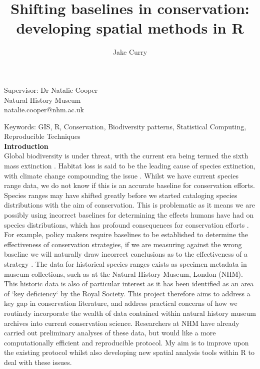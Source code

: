 \documentclass[11pt,onehalfspacing]{article}
\begin{document}
\begin{titlepage}
			
			\title{%
				Shifting baselines in conservation: developing spatial methods in R}
			
			\author{Jake Curry}
			
			\maketitle
			\begin{center}
				\large Supervisor: Dr Natalie Cooper \\Natural History Museum \\ natalie.cooper@nhm.ac.uk
			\end{center}
			
\end{titlepage}
Keywords: GIS, R, Conservation, Biodiversity patterns, Statistical Computing, Reproducible Techniques \\

\textbf{Introduction} \\
Global biodiversity is under threat, with the current era being termed the sixth mass extinction  \cite{Barnosky2011}. Habitat loss is said to be the leading cause of species extinction\cite{Brooks2002}, with climate change compounding the issue \cite{Thomas2004}. Whilst we have current species range data, we do not know if this is an accurate baseline for conservation efforts. Species ranges may have shifted greatly before we started cataloging species distributions with the aim of conservation. This is problematic as it means we are possibly using incorrect baselines for determining the effects humans have had on species distributions, which has profound consequences for conservation efforts \cite{Froyd2008}. For example, policy makers require baselines to be established to determine the effectiveness of conservation strategies, if we are measuring against the wrong baseline we will naturally draw incorrect conclusions as to the effectiveness of a strategy \cite{Willis2005}\cite{ Willis2006}. The data for historical species ranges exists as specimen metadata in museum collections, such as at the Natural History Museum, London (NHM).  
This historic data is also of particular interest as it has been identified as an area of `key deficiency` by the Royal Society\cite{RoyalSocietyWorkingParty2003}. This project therefore aims to address a key gap in conservation literature, and address practical concerns of how we routinely incorporate the wealth of data contained within natural history museum archives into current conservation science. 
Researchers at NHM have already carried out preliminary analyses of these data, but would like a more computationally efficient and reproducible protocol. My aim is to improve upon the existing protocol whilst also developing new spatial analysis tools within R to deal with these issues. \\
\end{document}
